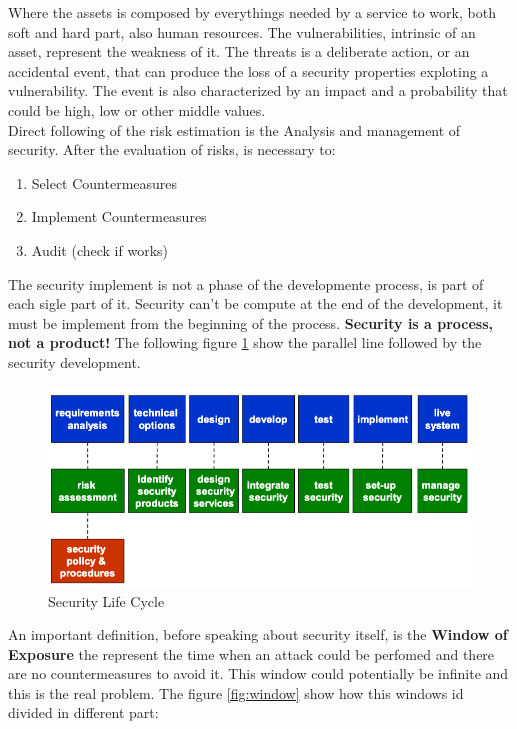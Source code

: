 \documentclass[12pt]{article}
\begin{document}
Where the assets is composed by everythings needed by a service to work, both soft and hard part, also human resources. The vulnerabilities, intrinsic of an asset, represent the weakness of it. The threats is a deliberate action, or an accidental event, that can produce the loss of a security properties exploting a vulnerability. The event is also characterized by an impact and a probability that could be high, low or other middle values.\\
Direct following of the risk estimation is the Analysis and management of security. After the evaluation of risks, is necessary to:
\begin{enumerate}
  \item Select Countermeasures
  \item Implement Countermeasures
  \item Audit (check if works)
\end{enumerate}

The security implement is not a phase of the developmente process, is part of each sigle part of it. Security can't be compute at the end of the development, it must be implement from the beginning of the process. \textbf{Security is a process, not a product!} The following figure \ref{fig:dev} show the parallel line followed by the security development.

\begin{figure}[h!]
  \includegraphics[width=\linewidth]{images/dev.png}
  \caption{Security Life Cycle}
  \label{fig:dev}
\end{figure}

An important definition, before speaking about security itself, is the \textbf{Window of Exposure} the represent the time when an attack could be perfomed and there are no countermeasures to avoid it. This window could potentially be infinite and this is the real problem.
The figure \ref{fig:window} show how this windows id divided in different part:
\end{document}
